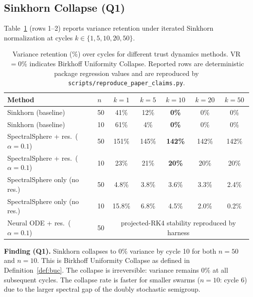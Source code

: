 \subsection{Sinkhorn Collapse (Q1)}
\label{sec:experiments_sinkhorn}

Table~\ref{tab:variance_results} (rows 1--2) reports variance retention under iterated
Sinkhorn normalization at cycles $k \in \{1, 5, 10, 20, 50\}$.

\begin{table}[t]
  \centering
  \caption{Variance retention (\%) over cycles for different trust dynamics methods.
    VR $= 0\%$ indicates Birkhoff Uniformity Collapse.
    Reported rows are deterministic package regression values and are reproduced by
    \texttt{scripts/reproduce\_paper\_claims.py}.}
  \label{tab:variance_results}
  \renewcommand{\arraystretch}{1.15}
  \begin{tabular}{llccccc}
    \toprule
    \textbf{Method} & \textbf{$n$} & \textbf{$k=1$} & \textbf{$k=5$} &
      \textbf{$k=10$} & \textbf{$k=20$} & \textbf{$k=50$} \\
    \midrule
    Sinkhorn (baseline)        & 50 & 41\%  & 12\%  & \textbf{0\%}  & 0\%  & 0\%  \\
    Sinkhorn (baseline)        & 10 & 61\%  & 4\%   & \textbf{0\%}  & 0\%  & 0\%  \\
    \midrule
    SpectralSphere + res.\ ($\alpha{=}0.1$) & 50 & 151\% & 145\% & \textbf{142\%} & 142\% & 142\% \\
    SpectralSphere + res.\ ($\alpha{=}0.1$) & 10 & 23\%  & 21\%  & \textbf{20\%}  & 20\%  & 20\%  \\
    SpectralSphere only (no res.)           & 50 & 4.8\% & 3.8\%  & 3.6\%  & 3.3\%  & 2.4\%  \\
    SpectralSphere only (no res.)           & 10 & 15.8\% & 6.8\%  & 4.5\%  & 2.0\%  & 0.2\%  \\
    \midrule
    Neural ODE + res.\ ($\alpha{=}0.1$)    & 50 & \multicolumn{5}{c}{projected-RK4 stability reproduced by harness} \\
    \bottomrule
  \end{tabular}
\end{table}

\textbf{Finding (Q1).}  Sinkhorn collapses to $0\%$ variance by cycle 10 for both $n=50$
and $n=10$.  This is Birkhoff Uniformity Collapse as defined in
Definition~\ref{def:buc}.  The collapse is irreversible: variance remains $0\%$ at all
subsequent cycles.  The collapse rate is faster for smaller swarms ($n=10$: cycle 6) due
to the larger spectral gap of the doubly stochastic semigroup.

